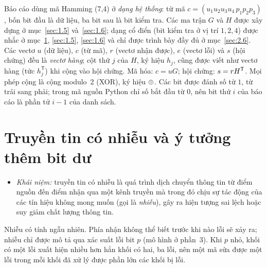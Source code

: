 \begin{quyuoc}
Báo cáo dùng mã Hamming (7,4) ở \emph{dạng hệ thống}: từ mã
$c = (u_1u_2u_3u_4\,p_1p_2p_3)$, bốn bit đầu là dữ liệu, ba bit sau là bit kiểm
tra. Các ma trận $G$ và $H$ được xây dựng ở mục~\ref{sec:1.5}
và~\ref{sec:1.6}; dạng cổ điển (bit kiểm tra ở vị trí $1, 2, 4$) được nhắc ở
mục~\ref{sec:1.1}, \ref{sec:1.5}, \ref{sec:1.6} và chỉ được trình bày đầy đủ ở
mục~\ref{sec:2.6}. Các vectơ $u$ (dữ liệu), $c$ (từ mã),
$r$ (vectơ nhận được), $e$ (vectơ lỗi) và $s$ (hội chứng) đều là
\emph{vectơ hàng}; cột thứ $j$ của $H$, ký hiệu $h_j$, cũng được viết như vectơ
hàng (tức $h_j^{\mathsf T}$) khi cộng vào hội chứng. Mã hóa: $c = uG$; hội
chứng: $s = rH^{\mathsf{T}}$. Mọi phép cộng là
cộng modulo~2 (XOR), ký hiệu $\oplus$. Các bit được đánh số từ $1$, từ trái sang
phải; trong mã nguồn Python chỉ số bắt đầu từ $0$, nên bit thứ $i$ của báo cáo
là phần tử $i-1$ của danh sách.
\end{quyuoc}

\section{Truyền tin có nhiễu và ý tưởng thêm bit dư}
\label{sec:1.1}

\begin{itemize}
  \item \emph{Khái niệm:} truyền tin có nhiễu là quá trình dịch chuyển thông
        tin từ điểm nguồn đến điểm nhận qua một kênh truyền mà trong đó chịu
        sự tác động của các tín hiệu không mong muốn (gọi là \emph{nhiễu}),
        gây ra hiện tượng sai lệch hoặc suy giảm chất lượng thông tin.
\end{itemize}

\begin{ketluan}
Nhiễu có tính ngẫu nhiên. Phía nhận không thể biết trước khi nào lỗi sẽ xảy
ra; nhiễu chỉ được mô tả qua xác suất lỗi bit $p$ (mô hình ở phần~3). Khi $p$
nhỏ, khối có một lỗi xuất hiện nhiều hơn hẳn khối có hai, ba lỗi, nên một mã
sửa được một lỗi trong mỗi khối đã xử lý được phần lớn các khối bị lỗi.
\end{ketluan}

